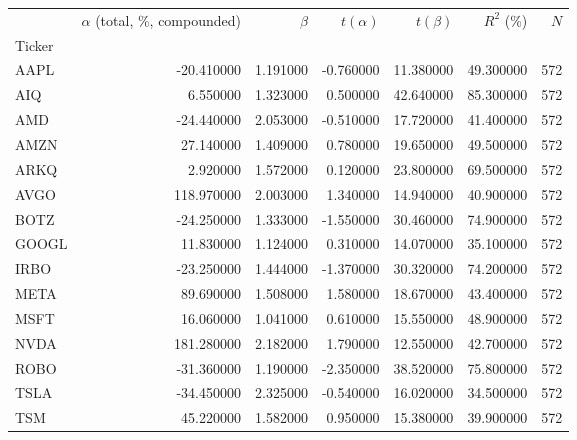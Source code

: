 \begin{tabular}{lrrrrrr}
\toprule
 & $\alpha$ (total, \%, compounded) & $\beta$ & $t(\alpha)$ & $t(\beta)$ & $R^2$ (\%) & $N$ \\
Ticker &  &  &  &  &  &  \\
\midrule
AAPL & -20.410000 & 1.191000 & -0.760000 & 11.380000 & 49.300000 & 572 \\
AIQ & 6.550000 & 1.323000 & 0.500000 & 42.640000 & 85.300000 & 572 \\
AMD & -24.440000 & 2.053000 & -0.510000 & 17.720000 & 41.400000 & 572 \\
AMZN & 27.140000 & 1.409000 & 0.780000 & 19.650000 & 49.500000 & 572 \\
ARKQ & 2.920000 & 1.572000 & 0.120000 & 23.800000 & 69.500000 & 572 \\
AVGO & 118.970000 & 2.003000 & 1.340000 & 14.940000 & 40.900000 & 572 \\
BOTZ & -24.250000 & 1.333000 & -1.550000 & 30.460000 & 74.900000 & 572 \\
GOOGL & 11.830000 & 1.124000 & 0.310000 & 14.070000 & 35.100000 & 572 \\
IRBO & -23.250000 & 1.444000 & -1.370000 & 30.320000 & 74.200000 & 572 \\
META & 89.690000 & 1.508000 & 1.580000 & 18.670000 & 43.400000 & 572 \\
MSFT & 16.060000 & 1.041000 & 0.610000 & 15.550000 & 48.900000 & 572 \\
NVDA & 181.280000 & 2.182000 & 1.790000 & 12.550000 & 42.700000 & 572 \\
ROBO & -31.360000 & 1.190000 & -2.350000 & 38.520000 & 75.800000 & 572 \\
TSLA & -34.450000 & 2.325000 & -0.540000 & 16.020000 & 34.500000 & 572 \\
TSM & 45.220000 & 1.582000 & 0.950000 & 15.380000 & 39.900000 & 572 \\
\bottomrule
\end{tabular}
